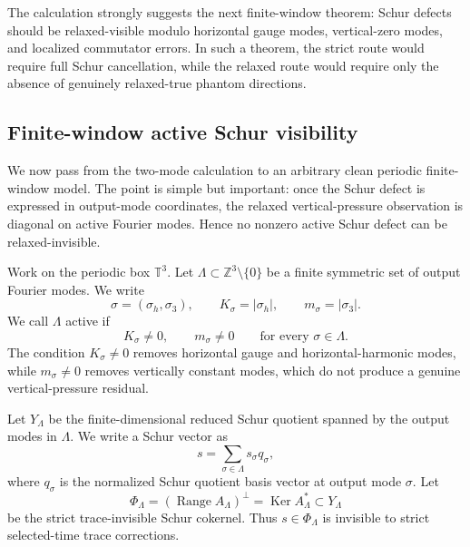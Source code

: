\documentclass[11pt]{article}
\numberwithin{equation}{section}
\DeclareMathOperator{\Range}{Range}
\DeclareMathOperator{\Ker}{Ker}
\begin{document}
The calculation strongly suggests the next finite-window theorem: Schur defects should be relaxed-visible modulo horizontal gauge modes, vertical-zero modes, and localized commutator errors.  In such a theorem, the strict route would require full Schur cancellation, while the relaxed route would require only the absence of genuinely relaxed-true phantom directions.

\subsection{Finite-window active Schur visibility}\label{subsec:finite-window-active-schur-visibility}

We now pass from the two-mode calculation to an arbitrary clean periodic finite-window model.  The point is simple but important: once the Schur defect is expressed in output-mode coordinates, the relaxed vertical-pressure observation is diagonal on active Fourier modes.  Hence no nonzero active Schur defect can be relaxed-invisible.

Work on the periodic box \(\mathbb T^3\).  Let \(\Lambda\subset \mathbb Z^3\setminus\{0\}\) be a finite symmetric set of output Fourier modes.  We write
\[
        \sigma=(\sigma_h,\sigma_3),
        \qquad
        K_\sigma=|\sigma_h|,
        \qquad
        m_\sigma=|\sigma_3|.
\]
We call \(\Lambda\) active if
\[
        K_\sigma\neq0,
        \qquad
        m_\sigma\neq0
        \qquad\text{for every }\sigma\in\Lambda.
\]
The condition \(K_\sigma\neq0\) removes horizontal gauge and horizontal-harmonic modes, while \(m_\sigma\neq0\) removes vertically constant modes, which do not produce a genuine vertical-pressure residual.

Let \(Y_\Lambda\) be the finite-dimensional reduced Schur quotient spanned by the output modes in \(\Lambda\).  We write a Schur vector as
\[
        s=\sum_{\sigma\in\Lambda}s_\sigma q_\sigma,
\]
where \(q_\sigma\) is the normalized Schur quotient basis vector at output mode \(\sigma\).  Let
\[
        \Phi_\Lambda=(\Range A_\Lambda)^\perp
        =\Ker A_\Lambda^*
        \subset Y_\Lambda
\]
be the strict trace-invisible Schur cokernel.  Thus \(s\in\Phi_\Lambda\) is invisible to strict selected-time trace corrections.
\end{document}
